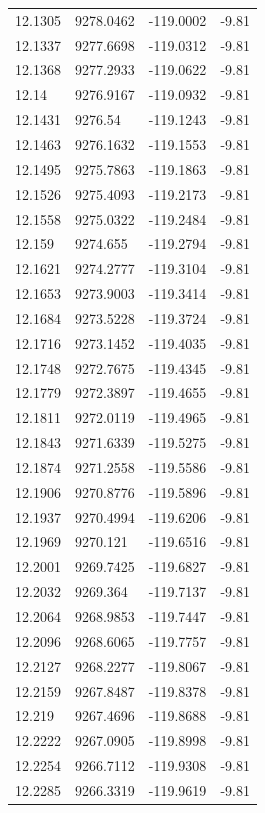 \begin{table}[H]
\begin{tabular}{llll}
12.1305 & 9278.0462 & -119.0002 & -9.81 \\
12.1337 & 9277.6698 & -119.0312 & -9.81 \\
12.1368 & 9277.2933 & -119.0622 & -9.81 \\
12.14 & 9276.9167 & -119.0932 & -9.81 \\
12.1431 & 9276.54 & -119.1243 & -9.81 \\
12.1463 & 9276.1632 & -119.1553 & -9.81 \\
12.1495 & 9275.7863 & -119.1863 & -9.81 \\
12.1526 & 9275.4093 & -119.2173 & -9.81 \\
12.1558 & 9275.0322 & -119.2484 & -9.81 \\
12.159 & 9274.655 & -119.2794 & -9.81 \\
12.1621 & 9274.2777 & -119.3104 & -9.81 \\
12.1653 & 9273.9003 & -119.3414 & -9.81 \\
12.1684 & 9273.5228 & -119.3724 & -9.81 \\
12.1716 & 9273.1452 & -119.4035 & -9.81 \\
12.1748 & 9272.7675 & -119.4345 & -9.81 \\
12.1779 & 9272.3897 & -119.4655 & -9.81 \\
12.1811 & 9272.0119 & -119.4965 & -9.81 \\
12.1843 & 9271.6339 & -119.5275 & -9.81 \\
12.1874 & 9271.2558 & -119.5586 & -9.81 \\
12.1906 & 9270.8776 & -119.5896 & -9.81 \\
12.1937 & 9270.4994 & -119.6206 & -9.81 \\
12.1969 & 9270.121 & -119.6516 & -9.81 \\
12.2001 & 9269.7425 & -119.6827 & -9.81 \\
12.2032 & 9269.364 & -119.7137 & -9.81 \\
12.2064 & 9268.9853 & -119.7447 & -9.81 \\
12.2096 & 9268.6065 & -119.7757 & -9.81 \\
12.2127 & 9268.2277 & -119.8067 & -9.81 \\
12.2159 & 9267.8487 & -119.8378 & -9.81 \\
12.219 & 9267.4696 & -119.8688 & -9.81 \\
12.2222 & 9267.0905 & -119.8998 & -9.81 \\
12.2254 & 9266.7112 & -119.9308 & -9.81 \\
12.2285 & 9266.3319 & -119.9619 & -9.81 \\

\end{tabular}
\end{table}

